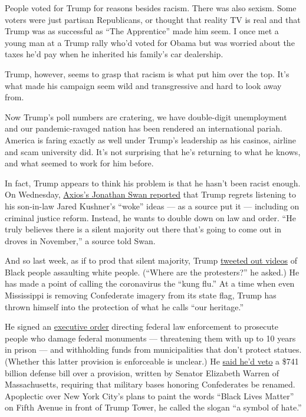 People voted for Trump for reasons besides racism. There was also
sexism. Some voters were just partisan Republicans, or thought that
reality TV is real and that Trump was as successful as ``The
Apprentice'' made him seem. I once met a young man at a Trump rally
who'd voted for Obama but was worried about the taxes he'd pay when he
inherited his family's car dealership.

Trump, however, seems to grasp that racism is what put him over the top.
It's what made his campaign seem wild and transgressive and hard to look
away from.

Now Trump's poll numbers are cratering, we have double-digit
unemployment and our pandemic-ravaged nation has been rendered an
international pariah. America is faring exactly as well under Trump's
leadership as his casinos, airline and scam university did. It's not
surprising that he's returning to what he knows, and what seemed to work
for him before.

In fact, Trump appears to think his problem is that he hasn't been
racist enough. On Wednesday,
\href{https://www.axios.com/trump-kushner-second-thoughts-408d5a33-725d-442a-88e4-d6ab6742c139.html}{Axios's
Jonathan Swan reported} that Trump regrets listening to his son-in-law
Jared Kushner's ``woke'' ideas --- as a source put it --- including on
criminal justice reform. Instead, he wants to double down on law and
order. ``He truly believes there is a silent majority out there that's
going to come out in droves in November,'' a source told Swan.

And so last week, as if to prod that silent majority, Trump
\href{https://www.washingtonpost.com/nation/2020/06/23/trump-videos-black-violence-protests/}{tweeted
out videos} of Black people assaulting white people. (``Where are the
protesters?'' he asked.) He has made a point of calling the coronavirus
the ``kung flu.'' At a time when even Mississippi is removing
Confederate imagery from its state flag, Trump has thrown himself into
the protection of what he calls ``our heritage.''

He signed an
\href{https://www.vox.com/policy-and-politics/2020/6/27/21305396/trump-confederate-monuments-executive-order}{executive
order} directing federal law enforcement to prosecute people who damage
federal monuments --- threatening them with up to 10 years in prison ---
and withholding funds from municipalities that don't protect statues.
(Whether this latter provision is enforceable is unclear.) He
\href{https://www.nytimes3xbfgragh.onion/aponline/2020/07/01/us/politics/ap-us-congress-confederate-symbols.html}{said
he'd veto} a \$741 billion defense bill over a provision, written by
Senator Elizabeth Warren of Massachusetts, requiring that military bases
honoring Confederates be renamed. Apoplectic over New York City's plans
to paint the words ``Black Lives Matter'' on Fifth Avenue in front of
Trump Tower, he called the slogan ``a symbol of hate.''


